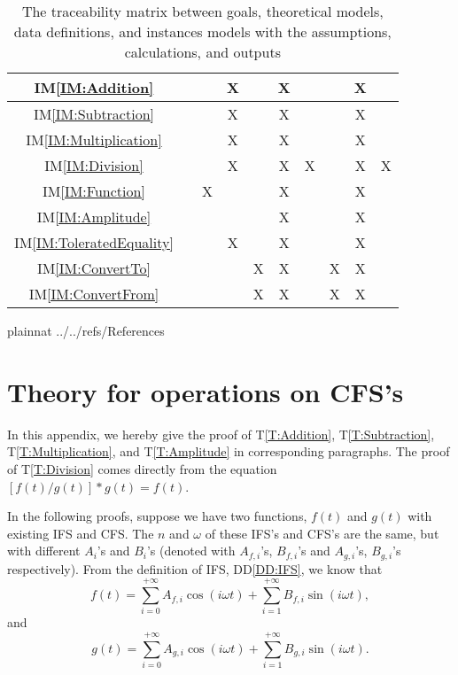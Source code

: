 \documentclass[12pt]{article}
\newcommand{\ddref}[1]{DD\ref{#1}}
\newcommand{\tref}[1]{T\ref{#1}}
\newcommand{\iref}[1]{IM\ref{#1}}
\begin{document}
\begin{table}
\begin{tabular}{|c|c|c|c|c|c|c|c|c|c|}
		\iref{IM:Addition}
		& & &X& &X& & &X& \\\hline
		\iref{IM:Subtraction}
		& & &X& &X& & &X& \\\hline
		\iref{IM:Multiplication}
		& & &X& &X& & &X& \\\hline
		\iref{IM:Division}
		& & &X& &X&X& &X&X\\\hline
		\iref{IM:Function}
		& &X& & &X& & &X& \\\hline
		\iref{IM:Amplitude}
		& & & & &X& & &X& \\\hline
		\iref{IM:ToleratedEquality}
		& & &X& &X& & &X& \\\hline
		\iref{IM:ConvertTo}
		& & & &X&X& &X&X& \\\hline
		\iref{IM:ConvertFrom}
		& & & &X&X& &X&X& \\\hline		
	\end{tabular}
	\caption{The traceability matrix between goals, 
	theoretical models, data definitions, and instances models 
	with the assumptions, calculations, and outputs}
	\label{Table:Traceability}
\end{table} 
\newpage

 {plainnat}
 {../../refs/References}

\newpage
\appendix

\section{Theory for operations on CFS's}\label{Appendix:Operations}
In this appendix, we hereby give the proof of 
\tref{T:Addition}, \tref{T:Subtraction}, \tref{T:Multiplication}, 
and \tref{T:Amplitude} in corresponding paragraphs. The proof of 
\tref{T:Division} comes directly from the equation 
$[f(t)/g(t)]*g(t)=f(t)$.

In the following proofs, suppose we have two functions, 
$f(t)$ and $g(t)$ with existing IFS and CFS. The $n$ and $\omega$ of 
these IFS's and CFS's are the same, but with different $A_i$'s and $B_i$'s 
(denoted with $A_{f, i}$'s, $B_{f, i}$'s and $A_{g,i}$'s, 
$B_{g,i}$'s respectively).
From the definition of IFS, \ddref{DD:IFS}, we know that 
\begin{equation}\label{Eq:fDef}
	f(t)=\sum_{i=0}^{+\infty}A_{f, i}\cos(i\omega t)
	+\sum_{i=1}^{+\infty}B_{f, i}\sin(i\omega t),
\end{equation} and \begin{equation}\label{Eq:gDef}
	g(t)=\sum_{i=0}^{+\infty}A_{g, i}\cos(i\omega t)
	+\sum_{i=1}^{+\infty}B_{g, i}\sin(i\omega t).
\end{equation}  
\end{document}
